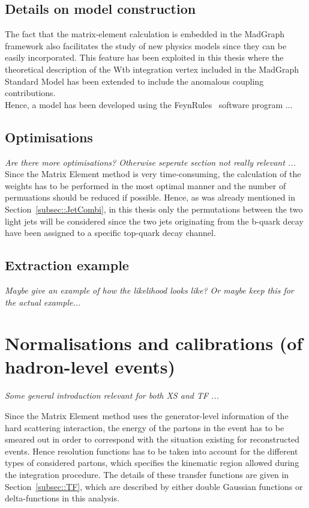 \subsection{Details on model construction}

The fact that the matrix-element calculation is embedded in the MadGraph framework also facilitates the study of new physics models since they can be easily incorporated.
This feature has been exploited in this thesis where the theoretical description of the Wtb integration vertex included in the MadGraph Standard Model has been extended to include the anomalous coupling contributions.
\\
Hence, a model has been developed using the FeynRules~\cite{} software program ...


\subsection{Optimisations}
\textit{Are there more optimisations? Otherwise seperate section not really relevant ...}
\\

Since the Matrix Element method is very time-consuming, the calculation of the weights has to be performed in the most optimal manner and the number of permuations should be reduced if possible.
Hence, as was already mentioned in Section~\ref{subsec::JetCombi}, in this thesis only the permutations between the two light jets will be considered since the two jets originating from the b-quark decay have been assigned to a specific top-quark decay channel.

\subsection{Extraction example}
\textit{Maybe give an example of how the likelihood looks like? Or maybe keep this for the actual example...}

\section{Normalisations and calibrations (of hadron-level events)} \label{sec::TF}

\textit{Some general introduction relevant for both XS and TF ...}

Since the Matrix Element method uses the generator-level information of the hard scattering interaction, the energy of the partons in the event has to be smeared out in order to correspond with the situation existing for reconstructed events. Hence resolution functions has to be taken into account for the different types of considered partons, which specifies the kinematic region allowed during the integration procedure.
The details of these transfer functions are given in Section~\ref{subsec::TF}, which are described by either double Gaussian functions or delta-functions in this analysis.

